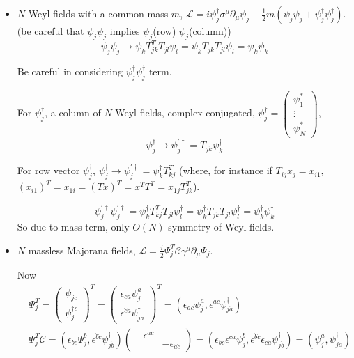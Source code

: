\documentclass[twoside]{amsart}
\begin{document}
\begin{itemize}
\item[(a)] $N$ Weyl fields with a common mass $m$, $\mathcal{L} = i \psi_j^{\dag} \sigma^{\mu } \partial_{\mu} \psi_j - \frac{1}{2} m (\psi_j \psi_j + \psi_j^{\dag} \psi_j^{\dag})$.  \\
  \phantom{ Weyl fields with } (be careful that $\psi_j \psi_j$ implies $\psi_j$(row) $\psi_j$(column))
\[
\psi_j \psi_j \to \psi_k T^T_{jk} T_{jl} \psi_l = \psi_k T_{jk} T_{jl} \psi_l = \psi_k \psi_k
\]

Be careful in considering $\psi_j^{\dag} \psi_j^{\dag}$ term.  

For $\psi_j^{\dag}$, a column of $N$ Weyl fields, complex conjugated, $\psi_j^{\dag} = \left( \begin{matrix} \psi_1^* \\ \vdots \\ \psi_N^* \end{matrix} \right)$, 
\[
\psi_j^{\dag} \to \psi_j^{' \dag } = T_{jk} \psi_k^{\dag}
\]

For row vector $\psi_j^{\dag}$, $\psi_j^{\dag} \to \psi_j^{' \dag} = \psi_k^{\dag} T_{kj}^T$ (where, for instance if $T_{ij} x_j = x_{i1}$, $(x_{i1})^T = x_{1i} = (Tx)^T = x^T T^T = x_{1j} T_{jk}^T$).  

\[
\psi_j^{' \dag} \psi_j^{' \dag} = \psi_k^{\dag} T^T_{kj} T_{jl} \psi_l^{\dag} = \psi_k^{\dag} T_{jk} T_{jl} \psi_l^{\dag} = \psi_k^{\dag} \psi_k^{\dag} 
\]
So due to mass term, only $O(N)$ symmetry of Weyl fields.  
\item[(b)] $N$ massless Majorana fields, $\mathcal{L} = \frac{i}{2} \Psi_j^T \mathcal{C} \gamma^{\mu} \partial_{\mu} \Psi_j$.  

Now
\[
\begin{aligned}
  & \Psi_j^T = \left( \begin{aligned} \psi_{jc} \\ \psi_j^{\dag \dot{c}} \end{aligned} \right)^T  = \left( \begin{aligned} \epsilon_{ca} \psi_j^a \\ \epsilon^{\dot{c} \dot{a}} \psi_{j \dot{a}}^{\dag} \end{aligned} \right)^T = ( \epsilon_{ac} \psi_j^a, \epsilon^{\dot{a} \dot{c}} \psi_{j \dot{a}}^{\dag} ) \\ 
  & \Psi_j^T \mathcal{C} = ( \epsilon_{bc} \Psi_j^b, \epsilon^{\dot{b} \dot{c}} \psi_{j \dot{b}}^{\dag} ) \left( \begin{matrix}  - \epsilon^{ac} & \\ & - \epsilon_{\dot{a} \dot{c}} \end{matrix} \right)  = ( \epsilon_{bc} \epsilon^{ca} \psi_j^b, \epsilon^{\dot{b} \dot{c}} \epsilon_{\dot{c} \dot{a}} \psi_{j\dot{b}}^{\dag} ) = (\psi_j^a, \psi_{j\dot{a}}^{\dag} )
\end{aligned}
\]


\end{itemize}
\end{document}
